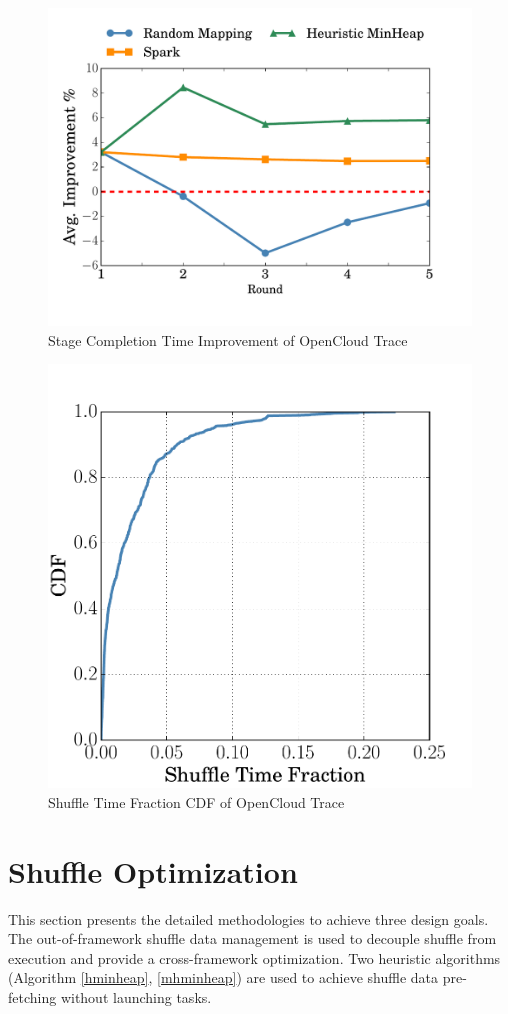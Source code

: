\begin{figure}
	\centering
	\includegraphics[width=0.75\linewidth]{fig/sim}
	\caption{Stage Completion Time Improvement of OpenCloud Trace}
	\label{fig:sim}
\end{figure}

\begin{figure}
	\centering
	\includegraphics[width=0.6\linewidth]{fig/reduce_cdf}
	\caption{Shuffle Time Fraction CDF of OpenCloud Trace}
	\label{fig:cdf}
\end{figure}

\section{Shuffle Optimization}\label{opt}
This section presents the detailed methodologies to achieve three design goals. The out-of-framework shuffle data management is used to decouple shuffle from execution and provide a cross-framework optimization. Two heuristic algorithms (Algorithm \ref{hminheap}, \ref{mhminheap}) are used to achieve shuffle data pre-fetching without launching tasks.

